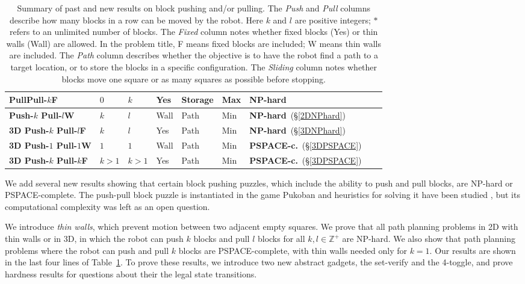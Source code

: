 \begin{table}
{\begin{tabular}{|l|l|l|l|l|l|l|l|l|}
PullPull-$k$F & $0$ & $k$ & Yes & Storage  & Max  & NP-hard\cite{Pull10} \\ \hline
\textbf{Push-$k$ Pull-$l$W} & $k$ & $l$ & Wall & Path  & Min & \textbf{NP-hard}\ (\S  \ref{2DNPhard}) \\ \hline
\textbf{3D Push-$k$ Pull-$l$F} & $k$ & $l$ & Yes & Path & Min &  \textbf{NP-hard}\ (\S  \ref{3DNPhard}) \\ \hline
\textbf{3D Push-$1$ Pull-$1$W} & $1$ & $1$ & Wall & Path & Min &  \textbf{PSPACE-c.}\ (\S  \ref{3DPSPACE}) \\ \hline
\textbf{3D Push-$k$ Pull-$k$F} & $k > 1$ & $k >1$ & Yes & Path & Min &  \textbf{PSPACE-c.}\ (\S  \ref{3DPSPACE}) \\ \hline
\end{tabular}
}
\caption{Summary of past and new results on block pushing and/or pulling. The \emph{Push} and \emph{Pull} columns describe how many blocks in a row can be moved by the robot. Here $k$ and $l$ are positive integers; $*$ refers to an unlimited number of blocks. The \emph{Fixed} column notes whether fixed blocks (Yes) or thin walls (Wall) are allowed. In the problem title, F means fixed blocks are included; W means thin walls are included. The \emph{Path} column describes whether the objective is to have the robot find a path to a target location, or to store the blocks in a specific configuration. The \emph{Sliding} column notes whether blocks move one square or as many squares as possible before stopping.}
\label{BlocksTable}
\end{table}

We add several new results showing that certain block pushing puzzles, which include the ability to push and pull blocks, are NP-hard or PSPACE-complete. The push-pull block puzzle is instantiated in the game Pukoban and heuristics for solving it have been studied \cite{zubaranagent}, but its computational complexity was left as an open question.

We introduce \emph{thin walls}, which prevent motion between two adjacent empty squares. We prove that all path planning problems in 2D with thin walls or in 3D, in which the robot can push $k$ blocks and pull $l$ blocks for all $k,l \in \mathbb{Z}^+$ are NP-hard. We also show that path planning problems where the robot can push and pull $k$ blocks are PSPACE-complete, with thin walls needed only for $k=1$. Our results are shown in the last four lines of Table~\ref{BlocksTable}. To prove these results, we introduce two new abstract gadgets, the set-verify and the 4-toggle, and prove hardness results for questions about their the legal state transitions. %

